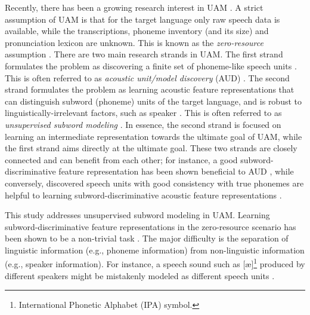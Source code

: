 \documentclass[transmag]{IEEEtran}
\begin{document}
Recently, there has been a growing research interest in UAM \cite{lee2012a,I3EWang,chen2015parallel,ondel2017bayesian,Tjandra2019,Feng2019combining}. 
A strict assumption of UAM is that for the target language only raw speech data is available, while the transcriptions, phoneme inventory (and its size) and pronunciation lexicon are unknown. This is known as the \textit{zero-resource} assumption \cite{versteegh2015zero}.  
There are two main research strands in UAM. The first strand formulates the problem as discovering a finite set of phoneme-like speech units \cite{lee2012a,I3EWang,lee2015unsupervised,ondel2018bayesian}. This is often referred to as \textit{acoustic unit/model discovery} (AUD) \cite{lee2012a,ondel2017bayesian}. The second strand formulates the problem as learning acoustic feature representations that can distinguish subword (phoneme) units of the target language, and is robust to linguistically-irrelevant factors, such as speaker  \cite{heck2017feature,oord2017neural,feng2019_TASLP}. This is often referred to as \textit{unsupervised subword modeling} \cite{versteegh2015zero,dunbar2017zero,feng2019_TASLP}. In essence, the second strand is focused on learning an intermediate representation towards the ultimate goal of UAM, while the first strand aims directly at the ultimate goal. These two strands are closely connected and can benefit from each other; for instance, a good
subword-discriminative feature representation 
has been shown beneficial to AUD \cite{Chen+2016,feng2016exploit}, while conversely,  discovered speech units with good consistency with true phonemes are helpful to
learning   subword-discriminative acoustic feature representations \cite{heck2017feature,feng2019_TASLP}. 

This study addresses unsupervised subword modeling in UAM. Learning subword-discriminative feature representations in the zero-resource scenario has been shown to be a non-trivial task \cite{versteegh2015zero,dunbar2017zero}. The major difficulty is the separation of linguistic information (e.g., phoneme information)  from non-linguistic information (e.g., speaker information).  
For instance, a speech sound such as [\ae]\footnote{International Phonetic Alphabet (IPA) symbol.} produced by different speakers  might be mistakenly modeled as different speech units \cite{lee2015spoken}. 
\end{document}

